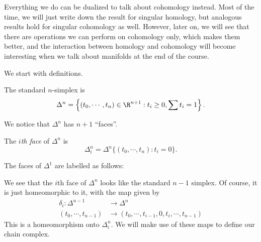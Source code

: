 \documentclass[a4paper]{article}
\begin{document}
Everything we do can be dualized to talk about cohomology instead. Most of the time, we will just write down the result for singular homology, but analogous results hold for singular cohomology as well. However, later on, we will see that there are operations we can perform on cohomology only, which makes them better, and the interaction between homology and cohomology will become interesting when we talk about manifolds at the end of the course.

We start with definitions.
\begin{defi}
  The standard $n$-simplex is
  \[
    \Delta^n = \left\{(t_0, \cdots, t_n) \in \R^{n + 1} : t_i \geq 0, \sum t_i = 1\right\}.
  \]
\end{defi}
\begin{center}
\end{center}
We notice that $\Delta^n$ has $n + 1$ ``faces''.
\begin{defi}
  The \emph{$i$th face} of $\Delta^n$ is
  \[
    \Delta_i^n = \Delta^n \{(t_0, \cdots, t_n): t_i = 0\}.
  \]
\end{defi}
\begin{eg}
  The faces of $\Delta^1$ are labelled as follows:
  \begin{center}
  \end{center}
\end{eg}
We see that the $i$th face of $\Delta^n$ looks like the standard $n-1$ simplex. Of course, it is just homeomorphic to it, with the map given by
\begin{align*}
  \delta_i: \Delta^{n - 1} &\to \Delta^n\\
  (t_0, \cdots, t_{n - 1}) &\to (t_0, \cdots, t_{i - 1}, 0, t_i, \cdots, t_{n - 1})
\end{align*}
This is a homeomorphism onto $\Delta_i^n$. We will make use of these maps to define our chain complex.
\end{document}
